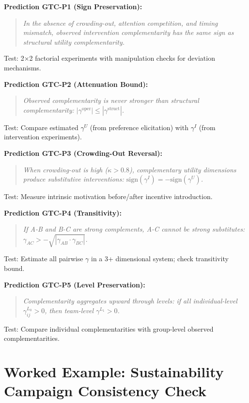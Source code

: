 \begin{tcolorbox}[colback=yellow!5!white, colframe=yellow!75!black,
    title=Falsifiable Predictions from GTC]

\textbf{Prediction GTC-P1 (Sign Preservation):}
\begin{quote}
\textit{In the absence of crowding-out, attention competition, and timing mismatch,
observed intervention complementarity has the same sign as structural utility
complementarity.}
\end{quote}
Test: 2×2 factorial experiments with manipulation checks for deviation mechanisms.

\textbf{Prediction GTC-P2 (Attenuation Bound):}
\begin{quote}
\textit{Observed complementarity is never stronger than structural complementarity:
$|\gamma^{\text{oper}}| \leq |\gamma^{\text{struct}}|$.}
\end{quote}
Test: Compare estimated $\gamma^U$ (from preference elicitation) with $\gamma^I$
(from intervention experiments).

\textbf{Prediction GTC-P3 (Crowding-Out Reversal):}
\begin{quote}
\textit{When crowding-out is high ($\kappa > 0.8$), complementary utility dimensions
produce substitutive interventions: $\text{sign}(\gamma^I) = -\text{sign}(\gamma^U)$.}
\end{quote}
Test: Measure intrinsic motivation before/after incentive introduction.

\textbf{Prediction GTC-P4 (Transitivity):}
\begin{quote}
\textit{If A-B and B-C are strong complements, A-C cannot be strong substitutes:
$\gamma_{AC} > -\sqrt{|\gamma_{AB} \cdot \gamma_{BC}|}$.}
\end{quote}
Test: Estimate all pairwise $\gamma$ in a 3+ dimensional system; check transitivity bound.

\textbf{Prediction GTC-P5 (Level Preservation):}
\begin{quote}
\textit{Complementarity aggregates upward through levels: if all individual-level
$\gamma^{L_0}_{ij} > 0$, then team-level $\gamma^{L_1} > 0$.}
\end{quote}
Test: Compare individual complementarities with group-level observed complementarities.

\end{tcolorbox}

\section{Worked Example: Sustainability Campaign Consistency Check}
\label{sec:gtc-example}


